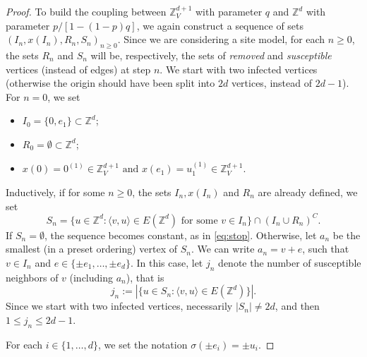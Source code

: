 \documentclass{aptpub}
\newcommand{\Z}{\mathbb{Z}}
\begin{document}
\begin{proof}
To build the coupling between $\Z^{d+1}_V$ with parameter $q$ and $\Z^d$ with parameter $p/[1  - (1-p)q]$, we again construct a sequence of sets $(I_n, x(I_n), R_n, S_n)_{n \geq 0}$. Since we are  considering a site model, for each $n \geq 0$, the sets $R_n$ and $S_n$ will be, respectively, the sets of {\it removed} and {\it susceptible} vertices (instead of edges) at step $n$. We start with two infected vertices (otherwise the origin should have been split into $2d$ vertices, instead of $2d-1$). For $n = 0$, we set %
\begin{itemize}
    \item $I_0 = \{0, e_1\} \subset \Z^d$;
    \item $R_0 = \emptyset \subset \Z^d$;
    \item $x(0) = 0^{(1)} \in \Z_V^{d+1} \text{ and } x(e_1) = u_1^{(1)} \in \Z_V^{d+1}. $
\end{itemize}
Inductively, if for some $n \geq 0$, the sets $I_n, x(I_n)$ and $R_n$ are already defined, we set 
\begin{equation}\label{eq:SnSITE}
    S_n = \{u \in \Z^d : \langle v,u \rangle \in E(\Z^d) \text{ for some } v \in I_n\} \cap (I_n \cup R_n)^C.
\end{equation} %
If $S_n = \emptyset$, the sequence becomes constant, as in \eqref{eq:stop}. Otherwise, let $a_n$ be the smallest (in a preset ordering) vertex of $S_n$. We can write $a_n =  v+ e$, such that $v \in I_n$ and $e \in \{\pm e_1, \dots, \pm e_d\}$. In this case, let $j_n$ denote the number of susceptible neighbors of $v$ (including $a_n$), that is
\begin{equation*}
    j_n := \left\vert \{ u \in S_n : \langle v, u \rangle \in  E(\Z^d)  \} \right\vert .
\end{equation*}
Since we start with two infected vertices, necessarily $|S_n| \neq 2d$, and then $1 \leq j_n \leq 2d-1$. 


For each $i \in \{1, \dots, d\}$, we set the notation $\sigma(\pm e_i) = \pm u_i$.


\end{proof}
\end{document}
